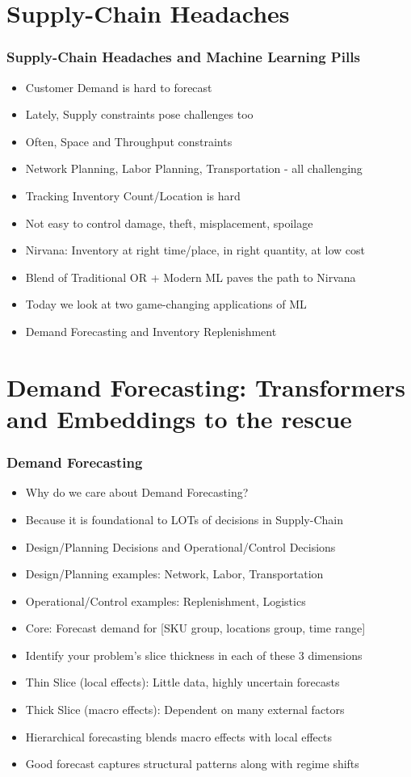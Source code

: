 \documentclass[handout]{beamer}
\begin{document}
\section{Supply-Chain Headaches}

\begin{frame}
\frametitle{Supply-Chain Headaches and Machine Learning Pills}
\pause
\begin{itemize}[<+->]
\item Customer Demand is hard to forecast
\item Lately, Supply constraints pose challenges too
\item Often, Space and Throughput constraints
\item Network Planning, Labor Planning, Transportation - all challenging
\item Tracking Inventory Count/Location is hard
\item Not easy to control damage, theft, misplacement, spoilage
\item Nirvana: Inventory at right time/place, in right quantity, at low cost
\item Blend of Traditional OR + Modern ML paves the path to Nirvana
\item Today we look at two game-changing applications of ML
\item Demand Forecasting and Inventory Replenishment
\end{itemize}
\end{frame}

\section{Demand Forecasting: Transformers and Embeddings to the rescue}

\begin{frame}
\frametitle{Demand Forecasting}
\pause
\begin{itemize}[<+->]
\item Why do we care about Demand Forecasting?
\item Because it is foundational to LOTs of decisions in Supply-Chain
\item Design/Planning Decisions and Operational/Control Decisions
\item Design/Planning examples: Network, Labor, Transportation
\item Operational/Control examples: Replenishment, Logistics
\item Core: Forecast demand for [SKU group, locations group, time range]
\item Identify your problem's slice thickness in each of these 3 dimensions
\item Thin Slice (local effects): Little data, highly uncertain forecasts
\item Thick Slice (macro effects): Dependent on many external factors
\item Hierarchical forecasting blends macro effects with local effects
\item Good forecast captures structural patterns along with regime shifts
\end{itemize}
\end{frame}
\end{document}
